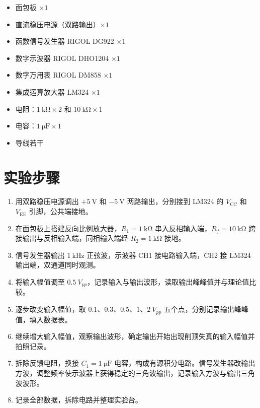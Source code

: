 \begin{itemize}
    \item 面包板 \(\times 1\)
    \item 直流稳压电源（双路输出）\(\times 1\)
    \item 函数信号发生器 RIGOL DG922 \(\times 1\)
    \item 数字示波器 RIGOL DHO1204 \(\times 1\)
    \item 数字万用表 RIGOL DM858 \(\times 1\)
    \item 集成运算放大器 LM324 \(\times 1\)
    \item 电阻：\(\SI{1}{\kilo\ohm}\times 2\) 和 \(\SI{10}{\kilo\ohm}\times 1\)
    \item 电容：\(\SI{1}{\micro\farad}\times 1\)
    \item 导线若干
\end{itemize}

\section{实验步骤}

\begin{enumerate}[label=\arabic*.]
    \item 用双路稳压电源调出 \(+\SI{5}{\volt}\) 和 \(-\SI{5}{\volt}\) 两路输出，分别接到 LM324 的 \(V_{\mathrm{CC}}\) 和 \(V_{\mathrm{EE}}\) 引脚，公共端接地。
    \item 在面包板上搭建反向比例放大器，\(R_1=\SI{1}{\kilo\ohm}\) 串入反相输入端，\(R_f=\SI{10}{\kilo\ohm}\) 跨接输出与反相输入端，同相输入端经 \(R_2=\SI{1}{\kilo\ohm}\) 接地。
    \item 信号发生器输出 \(\SI{1}{\kilo\hertz}\) 正弦波，示波器 CH1 接电路输入端，CH2 接 LM324 输出端，双通道同时观测。
    \item 将输入幅值调至 \(\SI{0.5}{V_{pp}}\)，记录输入与输出波形，读取输出峰峰值并与理论值比较。
    \item 逐步改变输入幅值，取 \(0.1\)、\(0.3\)、\(0.5\)、\(1\)、\(\SI{2}{V_{pp}}\) 五个点，分别记录输出峰峰值，填入数据表。
    \item 继续增大输入幅值，观察输出波形，确定输出开始出现削顶失真的输入幅值并拍照记录。
    \item 拆除反馈电阻，换接 \(C_1=\SI{1}{\micro\farad}\) 电容，构成有源积分电路。信号发生器改输出方波，调整频率使示波器上获得稳定的三角波输出，记录输入方波与输出三角波波形。
    \item 记录全部数据，拆除电路并整理实验台。
\end{enumerate}

